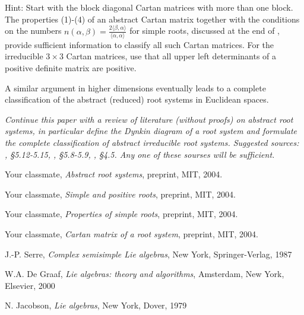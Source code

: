 \documentclass[11pt]{amsart}
\begin{document}
Hint: Start with the block diagonal Cartan matrices with more than 
one block. The properties (1)-(4) of an abstract Cartan matrix 
together with the conditions on the numbers 
$n(\alpha, \beta)= \frac{2\langle \beta, \alpha \rangle}{\langle 
\alpha, \alpha \rangle}$ for 
simple roots, discussed at the end of \cite{2}, provide 
sufficient information to classify all such Cartan 
matrices. For the irreducible $3\times 3$ Cartan matrices, use that 
all upper left determinants of a positive definite matrix are positive.  


A similar argument in higher dimensions eventually leads 
to a complete classification 
of the abstract (reduced) root systems in Euclidean spaces. 

{\it  Continue this paper with a review of literature (without proofs) on 
abstract root systems, in particular define the Dynkin diagram of a root 
system and formulate the complete classification of abstract irreducible 
root systems. Suggested sources: \cite{6}, \S 5.12-5.15, 
\cite{7}, \S 5.8-5.9, \cite{8}, \S 4.5. Any one of these sourses will be   
sufficient.}






\begin{thebibliography}{2}

 Your classmate, {\it Abstract root systems}, 
preprint, MIT, 2004. 

 Your classmate, {\it Simple and positive roots},
preprint, MIT, 2004.

 Your classmate, {\it Properties of simple roots},
preprint, MIT, 2004.

 Your classmate, {\it Cartan matrix of a root system},
preprint, MIT, 2004.

 J.-P. Serre, {\it Complex semisimple Lie algebras}, 
New York, Springer-Verlag, 1987

 W.A. De Graaf, {\it Lie algebras: theory and algorithms}, 
Amsterdam, New York, Elsevier, 2000 

 N. Jacobson, {\it Lie algebras}, New York, Dover, 1979

\end{thebibliography}
\end{document}
